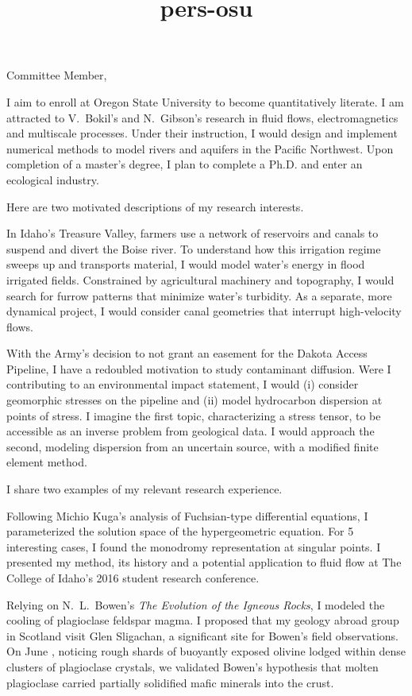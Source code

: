 \documentclass[10pt]{letter}
\date{}
\title{pers-osu}
\newcommand{\topic}[1]{\textmd{#1}}
\begin{document}
\begin{letter}{
}
\opening{Committee Member,}
I aim to enroll at Oregon State University to become quantitatively literate. I am attracted to V.~Bokil's and N.~Gibson's research in fluid flows, electromagnetics and multiscale processes. Under their instruction, I would design and implement numerical methods to model rivers and aquifers in the Pacific Northwest. Upon completion of a master's degree, I plan to complete a Ph.D. and enter an ecological industry.

Here are two motivated descriptions of my research interests. 
\begin{description}[topsep=0pt]
	\item[Sediment Transport]
		In Idaho's Treasure Valley, farmers use a network of reservoirs and canals to suspend and divert the Boise river. To understand how this irrigation regime sweeps up and transports material, I would model water's energy in flood irrigated fields. Constrained by agricultural machinery and topography, I would search for furrow patterns that minimize water's turbidity. As a separate, more dynamical project, I would consider canal geometries that interrupt high-velocity flows.
	\item[Ground Water Contamination]
		With the Army's decision to not grant an easement for the Dakota Access Pipeline, I have a redoubled motivation to study contaminant diffusion. Were I contributing to an environmental impact statement, I would (i) consider geomorphic stresses on the pipeline and (ii) model hydrocarbon dispersion at points of stress. I imagine the first topic, characterizing a stress tensor, to be accessible as an inverse problem from geological data. I would approach the second, modeling dispersion from an uncertain source, with a modified finite element method.
\end{description}

I share two examples of my relevant research experience. 
\begin{description}[topsep=0pt]
    \item[Galois Theory \& Fuchsian Equations] 
    	Following Michio Kuga's analysis of Fuchsian-type differential equations, I parameterized the solution space of the hypergeometric equation. For 5 interesting cases, I found the monodromy representation at singular points. I presented my method, its history and a potential application to \topic{fluid flow} at The College of Idaho's 2016 student research conference.
    \item[Igneous Dikes in Scotland]
        Relying on N.~L.~Bowen's \emph{The Evolution of the Igneous Rocks}, I modeled the cooling of plagioclase feldspar magma. I proposed that my geology abroad group in Scotland visit Glen Sligachan, a significant site for Bowen's field observations. On June , noticing rough shards of buoyantly exposed olivine lodged within dense clusters of plagioclase crystals, we validated Bowen's hypothesis that molten plagioclase carried partially solidified mafic minerals into the crust. 
\end{description}


\end{letter}
\end{document}
